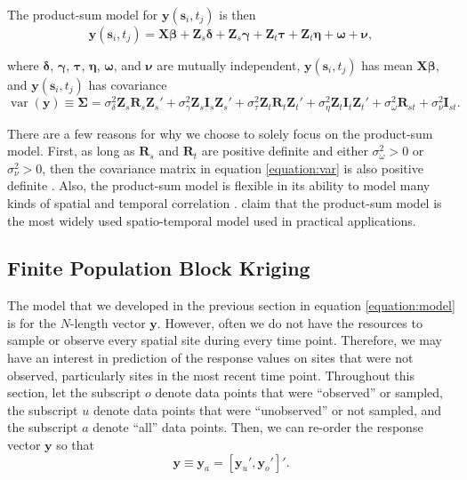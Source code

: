 \documentclass[]{interact}
\theoremstyle{plain}%
\theoremstyle{definition}
\theoremstyle{remark}
\begin{document}
The product-sum model for \(\mathbf{y}(\mathbf{s}_{i}, t_j)\) is then
\mbox{} \begin{equation} \label{equation:model}
\mathbf{y}(\mathbf{s}_{i}, t_j) = \mathbf{X} \bm{\beta} + \mathbf{Z}_{s} \bm{\delta} + \mathbf{Z}_{s} \bm{\gamma} + \mathbf{Z}_t \bm{\tau} + \mathbf{Z}_t \bm{\eta} + \bm{\omega} + \bm{\nu},
\end{equation}

\noindent where \(\bm{\delta}\), \(\bm{\gamma}\), \(\bm{\tau}\),
\(\bm{\eta}\), \(\bm{\omega}\), and \(\bm{\nu}\) are mutually
independent, \(\mathbf{y}(\mathbf{s}_{i}, t_j)\) has mean
\(\mathbf{X} \bm{\beta}\), and \(\mathbf{y}(\mathbf{s}_{i}, t_j)\) has
covariance \mbox{} \begin{equation}
\label{equation:var}
\mathop{\mathrm{{var}}}(\mathbf{y}) \equiv \bm{\Sigma} = \sigma^2_{\delta} \mathbf{Z}_{s} \mathbf{R}_{s} \mathbf{Z}_{s}' + \sigma^2_{\gamma} \mathbf{Z}_{s} \mathbf{I}_{s} \mathbf{Z}_{s}' + \sigma^2_{\tau} \mathbf{Z}_t \mathbf{R}_t \mathbf{Z}_t'+ \sigma^2_{\eta} \mathbf{Z}_t \mathbf{I}_t \mathbf{Z}_t' + \sigma^2_{\omega} \mathbf{R}_{st} + \sigma^2_{\nu} \mathbf{I}_{st}.
\end{equation}

\noindent There are a few reasons for why we choose to solely focus on
the product-sum model. First, as long as \(\mathbf{R}_s\) and
\(\mathbf{R}_t\) are positive definite and either
\(\sigma^2_{\omega} > 0\) or \(\sigma^2_{\nu} > 0\), then the covariance
matrix in equation \ref{equation:var} is also positive definite
\citep{de2001product, de2001space}. Also, the product-sum model is
flexible in its ability to model many kinds of spatial and temporal
correlation \citep{de2015spatio}. \citet{xu2015spatio} claim that the
product-sum model is the most widely used spatio-temporal model used in
practical applications.

\subsection{Finite Population Block Kriging} \label{subsection:fpbk}

The model that we developed in the previous section in equation
\ref{equation:model} is for the \(N\)-length vector \(\mathbf{y}\).
However, often we do not have the resources to sample or observe every
spatial site during every time point. Therefore, we may have an interest
in prediction of the response values on sites that were not observed,
particularly sites in the most recent time point. Throughout this
section, let the subscript \(o\) denote data points that were
``observed'' or sampled, the subscript \(u\) denote data points that
were ``unobserved'' or not sampled, and the subscript \(a\) denote
``all'' data points. Then, we can re-order the response vector
\(\mathbf{y}\) so that \mbox{} \begin{equation} \label{equation:ordered}
\mathbf{y} \equiv \mathbf{y}_a = [\mathbf{y}_u', \mathbf{y}_o']'.
\end{equation}
\end{document}
